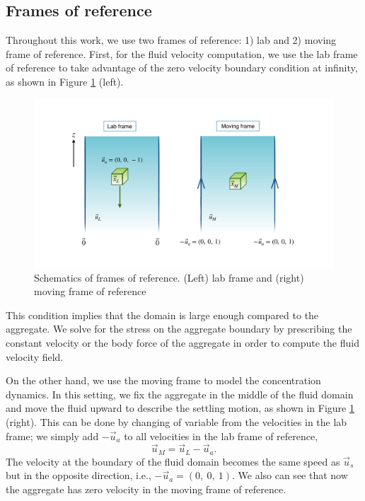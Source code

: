 \subsection{Frames of reference}
Throughout this work, we use two frames of reference: 1) lab and 2) moving frame of reference. First, for the fluid velocity computation, we use the lab frame of reference to take advantage of the zero velocity boundary condition at infinity, as shown in Figure \ref{fig_frame_ref} (left). 
\begin{figure}[h]
	\begin{center}
		\includegraphics[scale=0.25]{figures/fig_frame_ref}
	\end{center}
	\caption{Schematics of frames of reference. (Left) lab frame and (right) moving frame of reference }
	\label{fig_frame_ref}
\end{figure}
This condition implies that the domain is large enough compared to the aggregate.
We solve for the stress on the aggregate boundary by prescribing the constant velocity or the body force of the aggregate in order to compute the fluid velocity field. 
\par
On the other hand, we use the moving frame to model the concentration dynamics.
In this setting, we fix the aggregate in the middle of the fluid domain and move the fluid upward to describe the settling motion, as shown in Figure \ref{fig_frame_ref} (right).
This can be done by changing of variable from the velocities in the lab frame; we simply add $-\vec{u}_a$ to all velocities in the lab frame of reference,
\[
\vec{u}_M = \vec{u}_L - \vec{u}_a.
\]
 The velocity at the boundary of the fluid domain becomes the same speed as $\vec{u}_s$ but in the opposite direction, i.e., $-\vec{u}_a = (0, \ 0, \ 1)$. We also can see that now the aggregate has zero velocity in the moving frame of reference.

